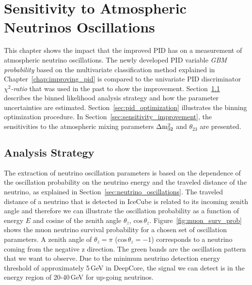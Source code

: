  \chapter{Sensitivity to Atmospheric Neutrinos Oscillations} \label{chap:oscillation_parameter_measurement}

This chapter shows the impact that the improved PID has on a measurement of atmospheric neutrino oscillations.
The newly developed PID variable \textit{GBM probability} based on the multivariate classification method explained in Chapter~\ref{chap:improving_pid} is compared to the univariate PID discriminator \textit{$\chi^2$-ratio} that was used in the past to show the improvement.
Section~\ref{sec:analysis_principle} describes the binned likelihood analysis strategy and how the parameter uncertainties are estimated.
Section~\ref{sec:pid_optimization} illustrates the binning optimization procedure.
In Section~\ref{sec:sensitivity_improvement}, the sensitivities to the atmospheric mixing parameters $\Delta \rm{m}^{2}_{32}$ and $\theta_{23}$ are presented.


\section{Analysis Strategy} \label{sec:analysis_principle}

The extraction of neutrino oscillation parameters is based on the dependence of the oscillation probability on the neutrino energy and the traveled distance of the neutrino, as explained in Section~\ref{sec:neutrino_oscillations}.
The traveled distance of a neutrino that is detected in IceCube is related to its incoming zenith angle and therefore we can illustrate the oscillation probability as a function of energy $E$ and cosine of the zenith angle $\theta_z$, $\mathrm{cos}\,\theta_z$.
Figure~\ref{fig:muon_surv_prob} shows the muon neutrino survival probability for a chosen set of oscillation parameters.
A zenith angle of $\theta_z=\pi$ ($\mathrm{cos}\,\theta_z=-1$) corresponds to a neutrino coming from the negative z direction.
The green bands are the oscillation pattern that we want to observe. Due to the minimum neutrino detection energy threshold of approximately 5\,GeV in DeepCore, the signal we can detect is in the energy region of 20-40\,GeV for up-going neutrinos.

